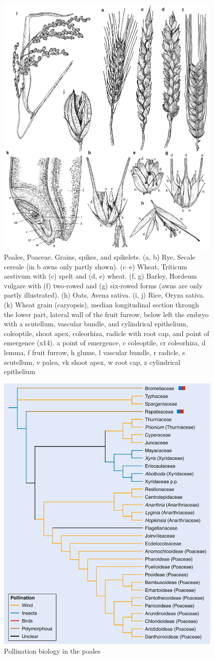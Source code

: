 \documentclass[ignorenonframetext,aspectratio=169]{beamer}
\begin{document}
\begin{frame}{}
\protect\hypertarget{section-24}{}

\begin{figure}
\includegraphics[width=0.35\linewidth]{./../images/poales_reproductive_morph} \caption{Poales, Poaceae. Grains, spikes, and spikelets. (a, b) Rye, Secale cereale (in b awns only partly shown). (c–e) Wheat, Triticum aestivum with (c) spelt and (d, e) wheat. (f, g) Barley, Hordeum vulgare with (f) two-rowed and (g) six-rowed forms (awns are only partly illustrated). (h) Oats, Avena sativa. (i, j) Rice, Oryza sativa. (k) Wheat grain (caryopsis), median longitudinal section through the lower part, lateral wall of the fruit furrow, below left the embryo with a scutellum, vascular bundle, and cylindrical epithelium, coleoptile, shoot apex, coleorhiza, radicle with root cap, and point of emergence (x14). a point of emergence, c coleoptile, cr coleorhiza, d lemma, f fruit furrow, h glume, l vascular bundle, r radicle, s scutellum, v palea, vk shoot apex, w root cap, z cylindrical epithelium}\label{fig:poales-reproductive}
\end{figure}

\end{frame}

\begin{frame}{}
\protect\hypertarget{section-25}{}

\begin{figure}
\includegraphics[width=0.35\linewidth]{./../images/poales_pollination_modes} \caption{Pollination biology in the poales}\label{fig:poales-pollination}
\end{figure}

\end{frame}
\end{document}
